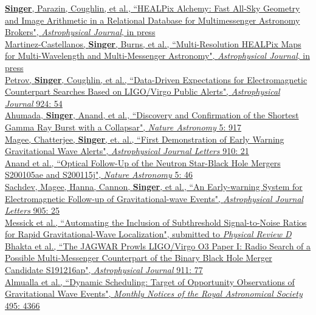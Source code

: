 \documentclass[10pt, letterpaper]{article} %
\newcommand{\years}[1]{\marginnote{\scriptsize #1}} %
\begin{document}
\years{2022}\href{https://arxiv.org/abs/2112.06947}{\textbf{Singer}, Parazin, Coughlin, et al., “HEALPix Alchemy: Fast All-Sky Geometry and Image Arithmetic in a Relational Database for Multimessenger Astronomy Brokers", \emph{Astrophysical Journal}, in press}\\[0.125cm]
%
\years{2022}\href{https://arxiv.org/abs/2111.11240}{Martinez-Castellanos, \textbf{Singer}, Burns, et al., “Multi-Resolution HEALPix Maps for Multi-Wavelength and Multi-Messenger Astronomy", \emph{Astrophysical Journal}, in press}\\[0.125cm]
%
\years{2022}\href{https://doi.org/10.3847/1538-4357/ac366d}{Petrov, \textbf{Singer}, Coughlin, et al., “Data-Driven Expectations for Electromagnetic Counterpart Searches Based on LIGO/Virgo Public Alerts", \emph{Astrophysical Journal} 924: 54}\\[0.125cm]
%
\years{2021}\href{https://doi.org/10.1038/s41550-021-01428-7}{Ahumada, \textbf{Singer}, Anand, et al., “Discovery and Confirmation of the Shortest Gamma Ray Burst with a Collapsar", \emph{Nature Astronomy} 5: 917}\\[0.125cm]
%
\years{2021}\href{https://doi.org/10.3847/2041-8213/abed54}{Magee, Chatterjee, \textbf{Singer}, et. al., “First Demonstration of Early Warning Gravitational Wave Alerts", \emph{Astrophysical Journal Letters} 910: 21}\\[0.125cm]
%
\years{2021}\href{https://doi.org/10.1038/s41550-020-1183-3}{Anand et al., “Optical Follow-Up of the Neutron Star-Black Hole Mergers S200105ae and S200115j", \emph{Nature Astronomy} 5: 46}\\[0.125cm]
%
\years{2020}\href{https://doi.org/10.3847/2041-8213/abc753}{Sachdev, Magee, Hanna, Cannon, \textbf{Singer}, et al., “An Early-warning System for Electromagnetic Follow-up of Gravitational-wave Events", \emph{Astrophysical Journal Letters} 905: 25}\\[0.125cm]
%
\years{2020}\href{https://arxiv.org/abs/2011.02457}{Messick et al., “Automating the Inclusion of Subthreshold Signal-to-Noise Ratios for Rapid Gravitational-Wave Localization", submitted to \emph{Physical Review D}}\\[0.125cm]
%
\years{2020}\href{https://doi.org/10.3847/1538-4357/abeaa8}{Bhakta et al., “The JAGWAR Prowls LIGO/Virgo O3 Paper I: Radio Search of a Possible Multi-Messenger Counterpart of the Binary Black Hole Merger Candidate S191216ap", \emph{Astrophysical Journal} 911: 77}\\[0.125cm]
%
\years{2020}\href{https://doi.org/10.1093/mnras/staa1498}{Almualla et al., “Dynamic Scheduling: Target of Opportunity Observations of Gravitational Wave Events", \emph{Monthly Notices of the Royal Astronomical Society} 495: 4366}\\[0.125cm]
\end{document}
